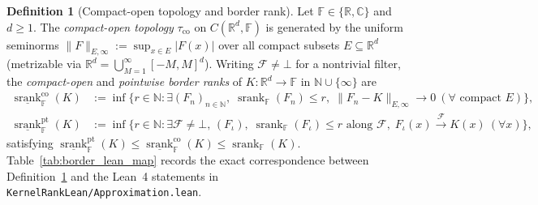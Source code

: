 \documentclass[11pt,a4paper]{article}
\theoremstyle{plain}
\theoremstyle{definition}
\newtheorem{definition}[theorem]{Definition}
\newcommand{\R}{\mathbb{R}}
\newcommand{\C}{\mathbb{C}}
\newcommand{\N}{\mathbb{N}}
\newcommand{\Field}{\mathbb{F}}
\DeclareMathOperator{\srank}{srank}
\begin{document}
\begin{definition}[Compact-open topology and border rank]\label{def:border_rank}
Let $\Field \in \{\R, \C\}$ and $d \ge 1$. The \emph{compact-open topology} $\tau_{\mathrm{co}}$ on $C(\R^d, \Field)$ is generated by the uniform seminorms $\|F\|_{E,\infty} := \sup_{x \in E} |F(x)|$ over all compact subsets $E \subseteq \R^d$ (metrizable via $\R^d = \bigcup_{M=1}^\infty [-M, M]^d$). Writing $\mathcal{F} \ne \bot$ for a nontrivial filter, the \emph{compact-open} and \emph{pointwise border ranks} of $K : \R^d \to \Field$ in $\N \cup \{\infty\}$ are
\begin{align*}
  \underline{\srank}_{\Field}^{\mathrm{co}}(K) &:= \inf\bigl\{r \in \N : \exists (F_n)_{n \in \N},\; \srank_{\Field}(F_n) \le r,\; \|F_n - K\|_{E,\infty} \to 0\ (\forall \text{ compact } E)\bigr\},\\
  \underline{\srank}_{\Field}^{\mathrm{pt}}(K) &:= \inf\bigl\{r \in \N : \exists \mathcal{F} \ne \bot,\, (F_\iota),\; \srank_{\Field}(F_\iota) \le r\text{ along }\mathcal{F},\; F_\iota(x) \xrightarrow{\mathcal{F}} K(x)\ (\forall x)\bigr\},
\end{align*}
satisfying $\underline{\srank}_{\Field}^{\mathrm{pt}}(K) \le \underline{\srank}_{\Field}^{\mathrm{co}}(K) \le \srank_{\Field}(K)$. Table~\ref{tab:border_lean_map} records the exact correspondence between Definition~\ref{def:border_rank} and the Lean~4 statements in \texttt{KernelRankLean/Approximation.lean}.
\end{definition}
\end{document}
